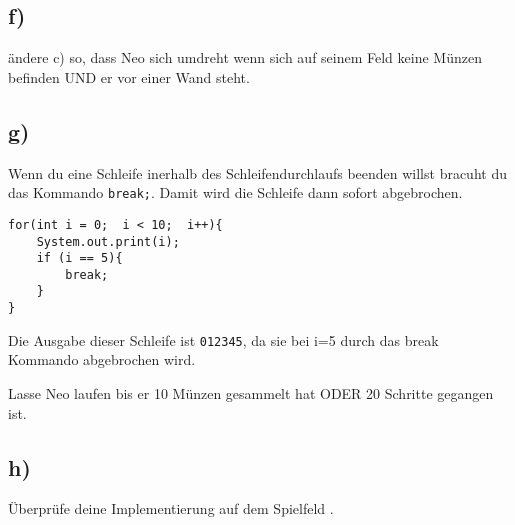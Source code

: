 	\subsection*{f)}
	ändere c) so, dass Neo sich umdreht wenn sich auf seinem Feld keine Münzen befinden UND er vor einer Wand steht.

\subsection*{g)}
\begin{Infobox}[Break]
Wenn du eine Schleife inerhalb des Schleifendurchlaufs beenden willst bracuht du das Kommando  \lstinline{break;}. Damit wird die Schleife dann sofort abgebrochen.
\begin{lstlisting}
for(int i = 0;  i < 10;  i++){
	System.out.print(i);
	if (i == 5){
		break;
	}
}
\end{lstlisting}
Die Ausgabe dieser Schleife ist \lstinline{012345}, da sie bei i=5 durch das break Kommando abgebrochen wird.
\end{Infobox}
Lasse Neo laufen bis er 10 Münzen gesammelt hat ODER 20 Schritte gegangen ist.

\subsection*{h)}
Überprüfe deine Implementierung auf dem Spielfeld .
\newpage